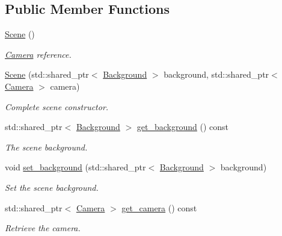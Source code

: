 \subsection*{Public Member Functions}
\begin{DoxyCompactItemize}
\item 
\mbox{\hyperlink{classomg_1_1_scene_af5d02c499b861b1293e0d6232dabd2c8}{Scene}} ()
\begin{DoxyCompactList}\small\item\em \mbox{\hyperlink{classomg_1_1_camera}{Camera}} reference. \end{DoxyCompactList}\item 
\mbox{\label{classomg_1_1_scene_a83a49456e4edc7d5cf5c6dc652b128ef}} 
\mbox{\hyperlink{classomg_1_1_scene_a83a49456e4edc7d5cf5c6dc652b128ef}{Scene}} (std\+::shared\+\_\+ptr$<$ \mbox{\hyperlink{classomg_1_1_background}{Background}} $>$ background, std\+::shared\+\_\+ptr$<$ \mbox{\hyperlink{classomg_1_1_camera}{Camera}} $>$ camera)
\begin{DoxyCompactList}\small\item\em Complete scene constructor. \end{DoxyCompactList}\item 
std\+::shared\+\_\+ptr$<$ \mbox{\hyperlink{classomg_1_1_background}{Background}} $>$ \mbox{\hyperlink{classomg_1_1_scene_a2eef3b62d9d01b19fb32751942f1fa7c}{get\+\_\+background}} () const
\begin{DoxyCompactList}\small\item\em The scene background. \end{DoxyCompactList}\item 
void \mbox{\hyperlink{classomg_1_1_scene_a66a4d47f99b8cf56d0ffeec665400d56}{set\+\_\+background}} (std\+::shared\+\_\+ptr$<$ \mbox{\hyperlink{classomg_1_1_background}{Background}} $>$ background)
\begin{DoxyCompactList}\small\item\em Set the scene background. \end{DoxyCompactList}\item 
std\+::shared\+\_\+ptr$<$ \mbox{\hyperlink{classomg_1_1_camera}{Camera}} $>$ \mbox{\hyperlink{classomg_1_1_scene_a7f9aac9cd9ea4d984ac2df98ae553967}{get\+\_\+camera}} () const
\begin{DoxyCompactList}\small\item\em Retrieve the camera. \end{DoxyCompactList}\item 

\end{DoxyCompactItemize}
